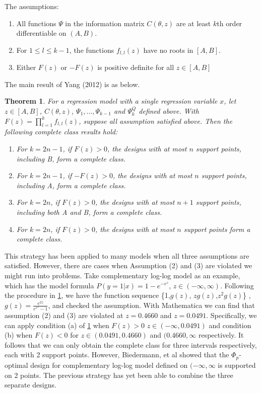 \documentclass[11pt]{amsart}
\newtheorem{theorem}{Theorem}[section]
\theoremstyle{definition}
\theoremstyle{remark}
\begin{document}
The assumptions:
\begin{enumerate}
\item All functions $\Psi$ in the information matrix $C(\theta,z)$ are at least $k$th order differentiable on $(A,B)$.
\item For $1\le l\le k-1$, the functions $f_{l,l}(z)$ have no roots in $[A,B]$.
\item Either $F(z)$ or $-F(z)$ is positive definite for all $z\in [A,B]$
\end{enumerate} 

The main result of Yang (2012) is as below.

\begin{theorem}\label{2012}
For a regression model with a single regression variable $x$, let $z\in[A,B]$, $C(\theta,z)$, $\Psi_1,\ldots, \Psi_{k-1}$ and $\Psi_k^Q$ defined above. With  $F(z) = \prod_{l=1}^k f_{l,l}(z)$, suppose all assumption satisfied above. Then the following complete class results hold:\begin{enumerate}
\item[(a)] For $k = 2n-1$, if $F(z)>0$, the designs with at most $n$ support points, including B, form a complete class.
\item[(b)] For $k = 2n-1$, if $-F(z)>0$, the designs with at most $n$ support points, including A, form a complete class.
\item[(c)] For $k = 2n$, if $F(z)>0$, the designs with at most $n+1$ support points, including both A and B, form a complete class.
\item[(d)] For $k = 2n$, if $F(z)>0$, the designs with at most $n$ support points form a complete class.
\end{enumerate}
\end{theorem}

 This strategy has been applied to many models when all three assumptions are satisfied. However, there are cases when Assumption (2) and (3) are violated we might run into problems. Take complementary log-log model as an example, which has the model formula $P(y=1|x) = 1-e^{-e^{z}}$, $z\in(-\infty,\infty)$. Following the procedure in \ref{2012}, we have the function sequence \{1,$g(z)$, $zg(z)$,$z^2g(z)$\} ,$g(z)=\frac{e^{2z}}{e^{e^z}-1}$, and checked the assumption. With Mathematica we can find that assumption (2) and (3) are violated at $z=0.4660$ and $z=0.0491$. Specifically, we can apply condition (a) of \ref{2012} when $F(z) >0$ $z\in (-\infty, 0.0491)$ and condition (b) when $F(z)<0$ for $z\in(0.0491, 0.4660)$ and $(0.4660,\infty$ respectively. It follows that we can only obtain the complete class for three intervals respectively, each with 2 support points. However, Biedermann, et al \cite{biedermann2006} showed that the $\Phi_p$-optimal design for complementary log-log model defined on $(-\infty,\infty$ is supported on 2 points. The previous strategy has yet been able to combine the three separate designs. 
 
\end{document}
